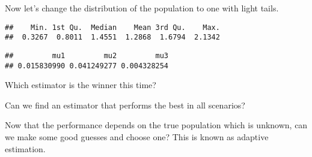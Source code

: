 \begin{illustration}
\label{example:has-unif}
Now let's change the distribution of the population to one with light tails.
\begin{knitrout}
\color{fgcolor}\begin{kframe}
\begin{alltt}
\hlstd{(}\hlstd{)}
 \hlkwb{<-} \hlstd{(}\hlstd{,}  \hlstd{=}\hlopt{-} \hlstd{,}  \hlstd{=} \hlstd{)}
 \hlkwb{<-}  \hlopt{-}  \hlopt{+} \hlstd{)}
\end{alltt}
\begin{verbatim}
##    Min. 1st Qu.  Median    Mean 3rd Qu.    Max. 
##  0.3267  0.8011  1.4551  1.2868  1.6794  2.1342
\end{verbatim}
\begin{alltt}
 \hlkwb{<-} \hlstd{(}\hlstd{,} \hlstd{) \{}
     \hlkwb{<-}  \hlopt{-}  \hlopt{+} \hlstd{)}
     \hlkwb{<-}  \hlstd{(} \hlstd{=}   \hlstd{=}   \hlstd{=} \hlstd{(}
     \hlopt{-} \hlopt{^}\hlstd{)}
\hlstd{\}}

 \hlkwb{<-}  
\end{alltt}
\begin{verbatim}
##         mu1         mu2         mu3 
## 0.015830990 0.041249277 0.004328254
\end{verbatim}
\end{kframe}
\end{knitrout}
Which estimator is the winner this time?
\end{illustration}


Can we find an estimator that performs the best in all scenarios?

Now that the performance depends on the true population which is
unknown, can we make some good guesses and choose one? This is known
as adaptive estimation.
